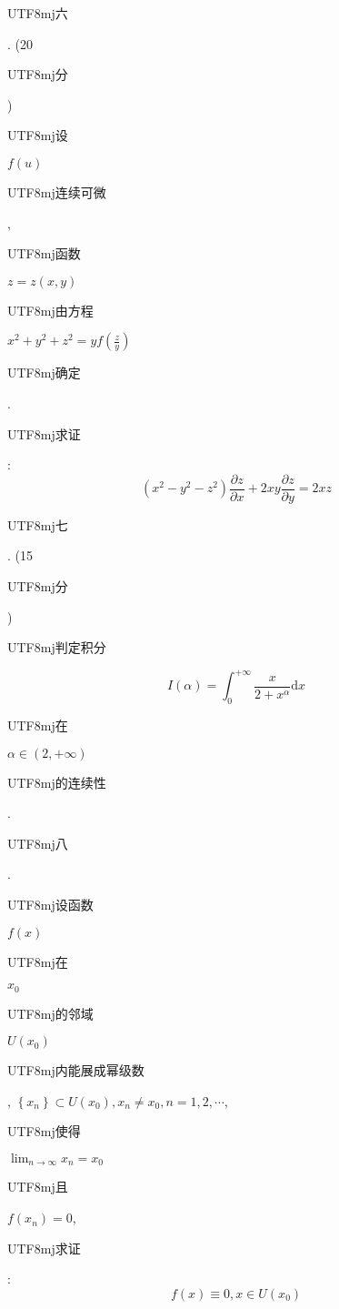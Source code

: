 \documentclass[10pt]{article}
\begin{document}
\begin{CJK}{UTF8}{mj}六\end{CJK}. (20 \begin{CJK}{UTF8}{mj}分\end{CJK}) \begin{CJK}{UTF8}{mj}设\end{CJK} $f(u)$ \begin{CJK}{UTF8}{mj}连续可微\end{CJK}, \begin{CJK}{UTF8}{mj}函数\end{CJK} $z=z(x, y)$ \begin{CJK}{UTF8}{mj}由方程\end{CJK} $x^{2}+y^{2}+z^{2}=y f\left(\frac{z}{y}\right)$ \begin{CJK}{UTF8}{mj}确定\end{CJK}. \begin{CJK}{UTF8}{mj}求证\end{CJK}:
$$
\left(x^{2}-y^{2}-z^{2}\right) \frac{\partial z}{\partial x}+2 x y \frac{\partial z}{\partial y}=2 x z
$$
\begin{CJK}{UTF8}{mj}七\end{CJK}. (15 \begin{CJK}{UTF8}{mj}分\end{CJK}) \begin{CJK}{UTF8}{mj}判定积分\end{CJK}
$$
I(\alpha)=\int_{0}^{+\infty} \frac{x}{2+x^{\alpha}} \mathrm{d} x
$$
\begin{CJK}{UTF8}{mj}在\end{CJK} $\alpha \in(2,+\infty)$ \begin{CJK}{UTF8}{mj}的连续性\end{CJK}.

\begin{CJK}{UTF8}{mj}八\end{CJK}. \begin{CJK}{UTF8}{mj}设函数\end{CJK} $f(x)$ \begin{CJK}{UTF8}{mj}在\end{CJK} $x_{0}$ \begin{CJK}{UTF8}{mj}的邻域\end{CJK} $U\left(x_{0}\right)$ \begin{CJK}{UTF8}{mj}内能展成幂级数\end{CJK}, $\left\{x_{n}\right\} \subset U\left(x_{0}\right), x_{n} \neq x_{0}, n=1,2, \cdots$, \begin{CJK}{UTF8}{mj}使得\end{CJK} $\lim _{n \rightarrow \infty} x_{n}=x_{0}$ \begin{CJK}{UTF8}{mj}且\end{CJK} $f\left(x_{n}\right)=0$, \begin{CJK}{UTF8}{mj}求证\end{CJK}:
$$
f(x) \equiv 0, x \in U\left(x_{0}\right)
$$
\end{document}
